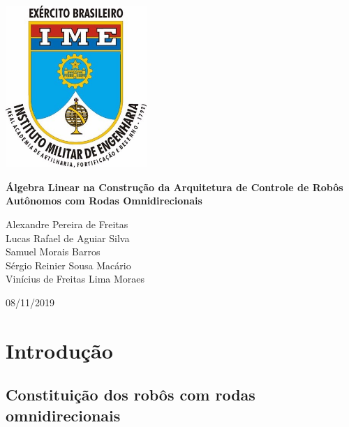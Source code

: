\documentclass{article}
\begin{document}
\begin{titlepage}
    \begin{center}

        \includegraphics[width=0.4\textwidth]{ime.jpg}

        \vspace{1cm}

        \Huge
        \textbf{Álgebra Linear na Construção da Arquitetura de Controle de Robôs Autônomos com Rodas Omnidirecionais}
 
        \vspace{0.5cm}
        \LARGE
 
        \vspace{1.5cm}
 
        Alexandre Pereira de Freitas\\
        Lucas Rafael de Aguiar Silva\\
        Samuel Morais Barros\\
        Sérgio Reinier Sousa Macário\\
        Vinícius de Freitas Lima Moraes\\
 
        \vfill
 
        \vspace{0.8cm}
 
        \Large
        08/11/2019
 
    \end{center}
\end{titlepage}

\tableofcontents
\newpage

\section{Introdução}
\subsection{Constituição dos robôs com rodas omnidirecionais}
\end{document}

